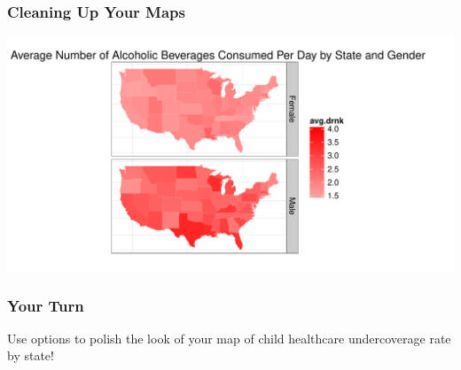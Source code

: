\documentclass{beamer}\usepackage[]{graphicx}\usepackage[]{color}
\newenvironment{knitrout}{}{} %
\begin{document}

\begin{frame}[fragile]
    \frametitle{Cleaning Up Your Maps}

\begin{knitrout}\footnotesize
{}\color{fgcolor}
\includegraphics[width=\textwidth]{figure/kalcohol5} 

\end{knitrout}

\end{frame}



\begin{frame}
    \frametitle{Your Turn}
    Use options to polish the look of your map of child healthcare undercoverage rate by state!
    
\end{frame}
\end{document}

